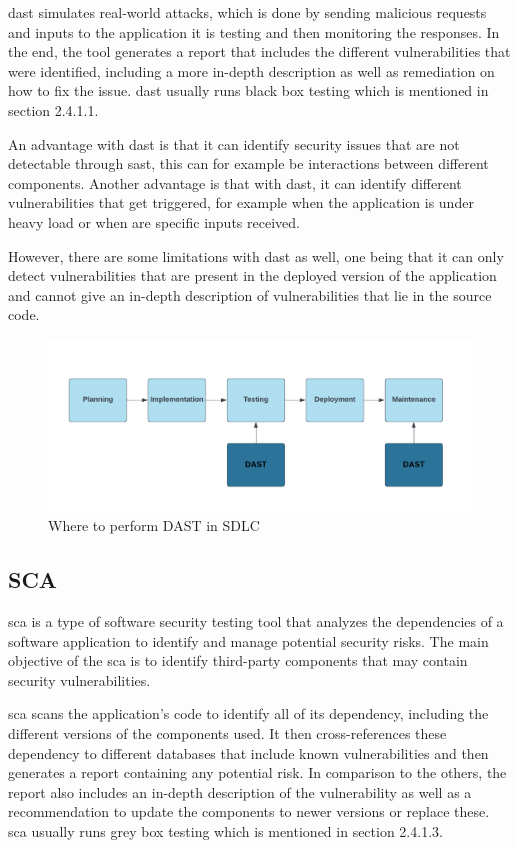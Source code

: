 \acrshort{dast} simulates real-world attacks, which is done by sending malicious requests and inputs to the application it is testing and then monitoring the responses. In the end, the tool generates a report that includes the different vulnerabilities that were identified, including a more in-depth description as well as remediation on how to fix the issue. 
\acrshort{dast} usually runs black box testing  which is mentioned in section 2.4.1.1. \cite{dast}

An advantage with \acrshort{dast} is that it can identify security issues that are not detectable through \acrshort{sast}, this can for example be interactions between different components. Another advantage is that with \acrshort{dast}, it can identify different vulnerabilities that get triggered, for example when the application is under heavy load or when are specific inputs received.

However, there are some limitations with \acrshort{dast} as well, one being that it can only detect vulnerabilities that are present in the deployed version of the application and cannot give an in-depth description of vulnerabilities that lie in the source code.
\begin{figure}[H]
    \centering
    \includegraphics[width=0.8\columnwidth]{Images/dast.png}
    \caption{Where to perform DAST in SDLC} 
    \label{fig: Where to perform DAST in SDLC}
\end{figure}



\subsection{SCA}
\acrlong{sca} is a type of software security testing tool that analyzes the dependencies of a software application to identify and manage potential security risks. The main objective of the \acrshort{sca} is to identify third-party components that may contain security vulnerabilities. \cite{sca}

 \acrshort{sca} scans the application's code to identify all of its \gls{dependency}, including the different versions of the components used. It then cross-references these \gls{dependency} to different databases that include known vulnerabilities and then generates a report containing any potential risk. In comparison to the others, the report also includes an in-depth description of the vulnerability as well as a recommendation to update the components to newer versions or replace these. \acrshort{sca} usually runs grey box testing  which is mentioned in section 2.4.1.3. 

